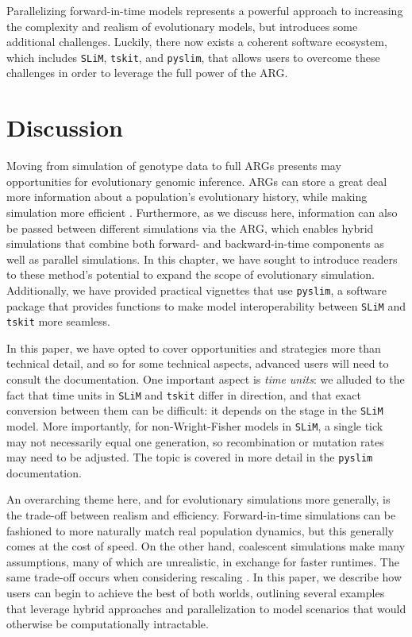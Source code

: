 \documentclass[12pt]{article}
\newcommand{\tskit}[0]{\texttt{tskit}\xspace}
\newcommand{\slim}[0]{\texttt{SLiM}\xspace}
\newcommand{\pyslim}[0]{\texttt{pyslim}\xspace}
\begin{document}
Parallelizing forward-in-time models represents a powerful approach to increasing the complexity and realism of evolutionary models, but introduces some additional challenges.
Luckily, there now exists a coherent software ecosystem, which includes \slim, \tskit, and \pyslim, that allows users to overcome these challenges in order to leverage the full
power of the ARG.

\section*{Discussion}

Moving from simulation of genotype data to full ARGs presents may opportunities for evolutionary genomic inference.
ARGs can store a great deal more information about a population's evolutionary history,
while making simulation more efficient \citep{kelleher_efficient_2018}.
Furthermore, as we discuss here, information can also be passed between different simulations via the ARG,
which enables hybrid simulations that combine both forward- and backward-in-time components as well as parallel simulations.
In this chapter, we have sought to introduce readers to these method's potential to expand the scope of evolutionary simulation.
Additionally, we have provided practical vignettes that use \pyslim,
a software package that provides functions to make model interoperability between \slim and \tskit more seamless.

In this paper, we have opted to cover opportunities and strategies more than technical detail,
and so for some technical aspects, advanced users will need to consult the documentation.
One important aspect is \emph{time units}:
we alluded to the fact that time units in \slim and \tskit differ in direction,
and that exact conversion between them can be difficult:
it depends on the stage in the \slim model.
More importantly, for non-Wright-Fisher models in \slim, a single tick may not necessarily equal one generation,
so recombination or mutation rates may need to be adjusted.
The topic is covered in more detail in the \pyslim documentation.

An overarching theme here, and for evolutionary simulations more generally, is the trade-off between realism and efficiency.
Forward-in-time simulations can be fashioned to more naturally match real population dynamics,
but this generally comes at the cost of speed. On the other hand, coalescent simulations make many assumptions, many of which
are unrealistic, in exchange for faster runtimes.
The same trade-off occurs when considering rescaling \citep{cury_simulation_2022,dabi_population_2025}.
In this paper, we describe how users can begin to achieve the best of both worlds,
outlining several examples that leverage hybrid approaches and parallelization to model scenarios that would otherwise be
computationally intractable.
\end{document}
